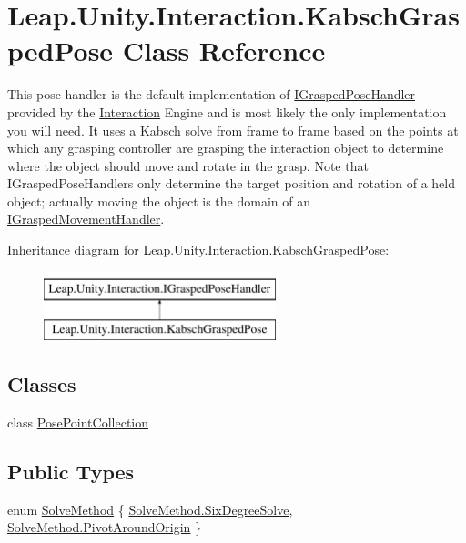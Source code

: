 \hypertarget{class_leap_1_1_unity_1_1_interaction_1_1_kabsch_grasped_pose}{}\section{Leap.\+Unity.\+Interaction.\+Kabsch\+Grasped\+Pose Class Reference}
\label{class_leap_1_1_unity_1_1_interaction_1_1_kabsch_grasped_pose}


This pose handler is the default implementation of \mbox{\hyperlink{interface_leap_1_1_unity_1_1_interaction_1_1_i_grasped_pose_handler}{I\+Grasped\+Pose\+Handler}} provided by the \mbox{\hyperlink{namespace_leap_1_1_unity_1_1_interaction}{Interaction}} Engine and is most likely the only implementation you will need. It uses a Kabsch solve from frame to frame based on the points at which any grasping controller are grasping the interaction object to determine where the object should move and rotate in the grasp. Note that I\+Grasped\+Pose\+Handlers only determine the target position and rotation of a held object; actually moving the object is the domain of an \mbox{\hyperlink{interface_leap_1_1_unity_1_1_interaction_1_1_i_grasped_movement_handler}{I\+Grasped\+Movement\+Handler}}.  


Inheritance diagram for Leap.\+Unity.\+Interaction.\+Kabsch\+Grasped\+Pose\+:\begin{figure}[H]
\begin{center}
\leavevmode
\includegraphics[height=2.000000cm]{class_leap_1_1_unity_1_1_interaction_1_1_kabsch_grasped_pose}
\end{center}
\end{figure}
\subsection*{Classes}
\begin{DoxyCompactItemize}
\item 
class \mbox{\hyperlink{class_leap_1_1_unity_1_1_interaction_1_1_kabsch_grasped_pose_1_1_pose_point_collection}{Pose\+Point\+Collection}}
\end{DoxyCompactItemize}
\subsection*{Public Types}
\begin{DoxyCompactItemize}
\item 
enum \mbox{\hyperlink{class_leap_1_1_unity_1_1_interaction_1_1_kabsch_grasped_pose_a64bea6d079b23aa85e12f322b017ed79}{Solve\+Method}} \{ \mbox{\hyperlink{class_leap_1_1_unity_1_1_interaction_1_1_kabsch_grasped_pose_a64bea6d079b23aa85e12f322b017ed79a1870591f17d2e1dc115e0709896e5970}{Solve\+Method.\+Six\+Degree\+Solve}}, 
\mbox{\hyperlink{class_leap_1_1_unity_1_1_interaction_1_1_kabsch_grasped_pose_a64bea6d079b23aa85e12f322b017ed79a0e8030980f3d020bd53f4b4d0e120a5d}{Solve\+Method.\+Pivot\+Around\+Origin}}
 \}
\end{DoxyCompactItemize}
